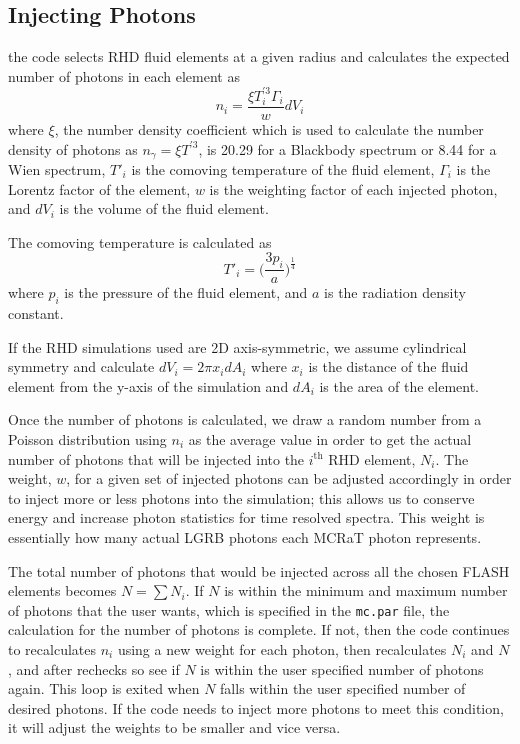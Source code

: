 \documentclass[12pt,a4paper]{article}
\begin{document}
\subsection{Injecting Photons} \label{inj}
the code selects RHD fluid elements at a given radius and calculates the expected number of photons in each element as
\begin{equation} \label{n_density}
n_i=\frac{\xi T_i^{'3}\Gamma_i}{w}dV_i 
\end{equation} 
where $\xi$, the number density coefficient which is used to calculate the number density of photons as $n_\gamma=\xi T^{'3}$, is 20.29 for a Blackbody spectrum or 8.44 for a Wien spectrum, $T'_i$ is the comoving temperature of the fluid element, $\Gamma_i$ is the Lorentz factor of the element, $w$ is the weighting factor of each injected photon, and $dV_i$ is the volume of the fluid element. 
 
The comoving temperature is calculated as
\begin{equation}
T'_i=\big( \frac{3p_i}{a} \big)^\frac{1}{4}
\end{equation}
where $p_i$ is the pressure of the fluid element, and $a$ is the radiation density constant.
 
If the RHD simulations used are 2D axis-symmetric, we assume cylindrical symmetry and calculate $dV_i=2\pi x_idA_i$ where $x_i$ is the distance of the fluid element from the y-axis of the simulation and $dA_i$ is the area of the element. 
 
Once the number of photons is calculated, we draw a random number from a Poisson distribution using $n_i$ as the average value in order to get the actual number of photons that will be injected into the $i^\text{th}$ RHD element, $N_i$. The weight, $w$, for a given set of injected photons can be adjusted accordingly in order to inject more or less photons into the simulation; this allows us to conserve energy and increase photon statistics for time resolved spectra. This weight is essentially how many actual LGRB photons each MCRaT photon represents.

The total number of photons that would be injected across all the chosen FLASH elements becomes $N=\sum N_i$. If $N$ is within the minimum and maximum number of photons that the user wants, which is specified in the \texttt{mc.par} file, the calculation for the number of photons is complete. If not, then the code continues to recalculates $n_i$ using a new weight for each photon, then recalculates $N_i$ and $N$, and after rechecks so see if $N$ is within the user specified number of photons again. This loop is exited when $N$ falls within the user specified number of desired photons. If the code needs to inject more photons to meet this condition, it will adjust the weights to be smaller and vice versa.
\end{document}
